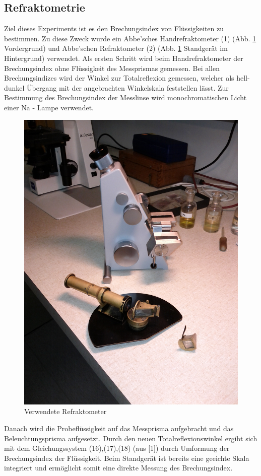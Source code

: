 \documentclass[12pt,a4paper]{article}
\begin{document}
\begin{multicols}{2}
\section{Refraktometrie}
Ziel dieses Experiments ist es den Brechungsindex von Flüssigkeiten zu bestimmen. Zu diese Zweck wurde ein Abbe’sches Handrefraktometer (1) (Abb. \ref{fig:geraete_refrakto} Vordergrund) und  Abbe’schen Refraktometer (2) (Abb.  \ref{fig:geraete_refrakto} Standgerät im Hintergrund) verwendet. Als ersten Schritt wird beim Handrefraktometer der Brechungsindex ohne Flüssigkeit des Messprismas gemessen. Bei allen Brechungsindizes wird der Winkel zur Totalreflexion gemessen, welcher als hell-dunkel Übergang mit der angebrachten Winkelskala feststellen lässt. Zur Bestimmung des Brechungsindex der Messlinse wird monochromatischen Licht einer Na - Lampe verwendet.
\begin{figure}[H]
	\centering
	\includegraphics[angle=-90,scale=0.11]{./figure/refrakto.jpg}
	\caption{Verwendete Refraktometer}
	\label{fig:geraete_refrakto}
\end{figure}
\noindent
Danach wird die Probeflüssigkeit auf das Messprisma aufgebracht und das Beleuchtungsprisma aufgesetzt. Durch den neuen Totalreflexionswinkel ergibt sich mit dem Gleichungssystem (16),(17),(18) (aus [1]) durch Umformung der Brechungsindex der Flüssigkeit. Beim Standgerät ist bereits eine geeichte Skala integriert und ermöglicht somit eine direkte Messung des Brechungsindex.


\end{multicols}
\end{document}
